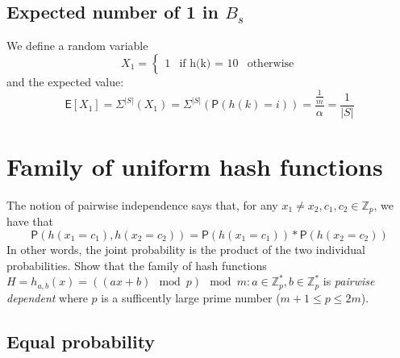 \documentclass{article}
\newcommand*{\expect}{\mathsf{E}}  %
\newcommand*{\prob}{\mathsf{P}}    %
\begin{document}
\subsection{Expected number of 1 in $B_{s}$}
We define a random variable
    \begin{equation}
    X_{1} = \begin{cases}
            1   & \textrm{if h(k) = 1}
            0   & \textrm{otherwise}
            \end{cases}
    \end{equation}
and the expected value:
    \begin{equation}
        \expect[X_{1}] = \Sigma^{|S|}(X_{1}) =
        \Sigma^{|S|}(\prob(h(k) = i)) =
        \frac{\frac{1}{m}}{\alpha} = \frac{1}{|S|}
    \end{equation}

\newpage
\section{Family of uniform hash functions}

The notion of pairwise independence says that, for any $x_{1} \neq x_{2}, c_{1}, c_{2}
\in \mathbb{Z}_{p}$, we have that
    \begin{equation}
    \prob(h(x_{1} = c_{1}), h(x_{2} = c_{2})) = \prob(h(x_{1} = c_{1})) * \prob(h(x_{2} = c_{2}))
    \end{equation}
In other words, the joint probability is the product of the two individual probabilities.
Show that the family of hash functions $H = {h_{a,b}(x) = ((ax + b) \mod p) \mod m}:
a \in \mathbb{Z}^{*}_{p},
b \in \mathbb{Z}^{*}_{p}$ is \emph{pairwise dependent}
where $p$ is a sufficently large prime number ($m + 1 \leq p \leq 2m$).

\subsection{Equal probability}
\end{document}
